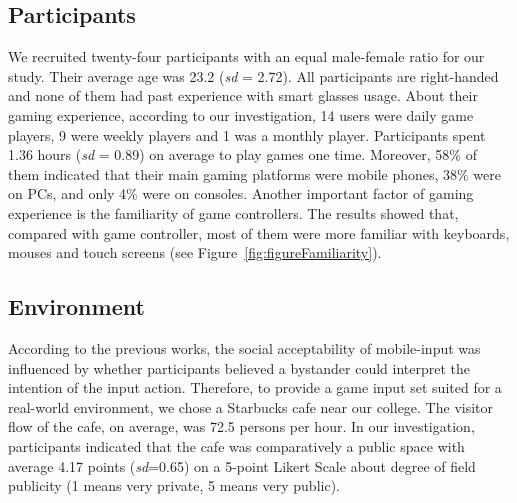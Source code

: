 \documentclass{sigchi}
\begin{document}
  \subsection {Participants}
  We recruited twenty-four participants with an equal male-female ratio for our study. Their average age was 23.2 (\textsl{sd} = 2.72). All participants are right-handed and none of them had past experience with smart glasses usage. About their gaming experience, according to our investigation, 14 users were daily game players, 9 were weekly players and 1 was a monthly player. Participants spent 1.36 hours (\textsl{sd} = 0.89) on average to play games one time. Moreover, 58\% of them indicated that their main gaming platforms were mobile phones, 38\% were on PCs, and only 4\% were on consoles. Another important factor of gaming experience is the familiarity of game controllers. The results showed that, compared with game controller, most of them were more familiar with keyboards, mouses and touch screens (see Figure~\ref{fig:figureFamiliarity}).
 

  \subsection {Environment}
  According to the previous works\cite{Wiliamson:2011:MMI:2070481.2070551,Williamson:2013:MEM:2522848.2522874,Montero:2010:YUS:1851600.1851647,Rico:2010:UGM:1753326.1753458}, the social acceptability of mobile-input was influenced by whether participants believed a bystander could interpret the intention of the input action. Therefore, to provide a game input set suited for a real-world environment, we chose a Starbucks cafe near our college. The visitor flow of the cafe, on average, was 72.5 persons per hour. In our investigation, participants indicated that the cafe was comparatively a public space with average 4.17 points (\textsl{sd}=0.65) on a 5-point Likert Scale about degree of field publicity (1 means very private, 5 means very public).    
\end{document}
